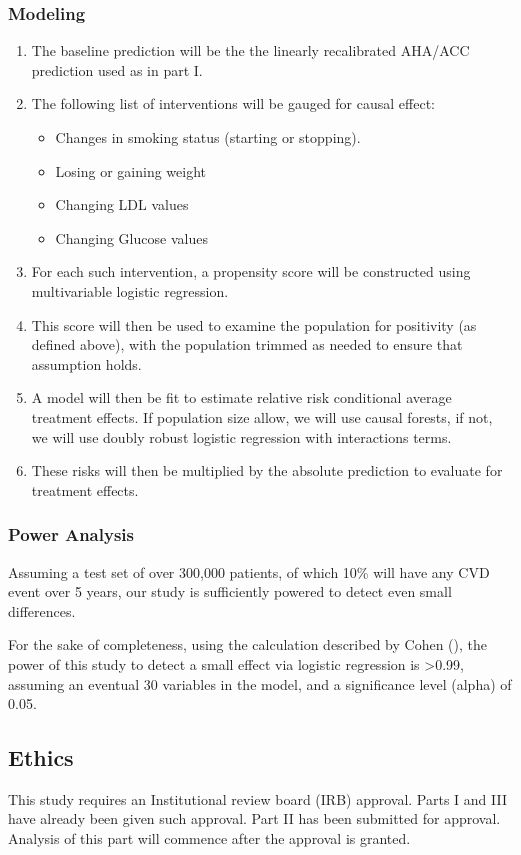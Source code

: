 \documentclass[a4paper,12pt]{article}
\begin{document}
		\subsubsection*{Modeling}
		\begin{enumerate}
			\item The baseline prediction will be the the linearly recalibrated AHA/ACC prediction used as in part I.
			\item The following list of interventions will be gauged for causal effect:
			\begin{itemize}
				\item Changes in smoking status (starting or stopping).
				\item Losing or gaining weight
				\item Changing LDL values
				\item Changing Glucose values
			\end{itemize}
			\item For each such intervention, a propensity score will be constructed using multivariable logistic regression.
			\item This score will then be used to examine the population for positivity (as defined above), with the population trimmed as needed to ensure that assumption holds.
			\item A model will then be fit to estimate relative risk conditional average treatment effects. If population size allow, we will use causal forests, if not, we will use doubly robust\cite{GuidoW.Imbens2015} logistic regression with interactions terms.
			\item These risks will then be multiplied by the absolute prediction to evaluate for treatment effects.
		\end{enumerate}
		
		\subsubsection*{Power Analysis}
		Assuming a test set of over 300,000 patients, of which 10\% will have any CVD event over 5 years, our study is sufficiently powered to detect even small differences.
		
		For the sake of completeness, using the calculation described by Cohen (\cite{Cohen1988}), the power of this study to detect a small effect via logistic regression is >0.99, assuming an eventual 30 variables in the model, and a significance level (alpha) of 0.05.
		
		\subsection{Ethics}
		This study requires an Institutional review board (IRB) approval. Parts I and III have already been given such approval. Part II has been submitted for approval. Analysis of this part will commence after the approval is granted.
	
\end{document}
